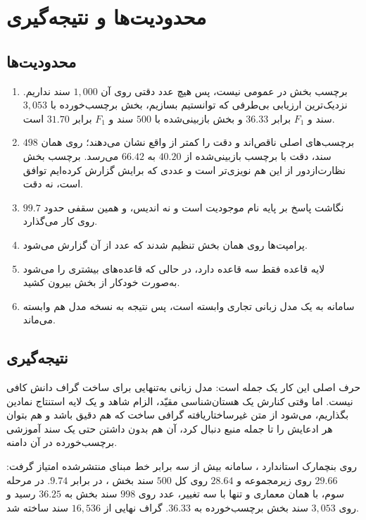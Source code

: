 \chapter{محدودیت‌ها و نتیجه‌گیری}
\label{ch:conclusion}

\section{محدودیت‌ها}
\label{sec:limitations}

\begin{enumerate}
\item برچسب بخش  در  عمومی نیست، پس هیچ عدد دقتی روی آن $1{,}000$ سند نداریم. نزدیک‌ترین ارزیابی بی‌طرفی که توانستیم بسازیم، بخش  برچسب‌خورده با $3{,}053$ سند و $F_1$ برابر $36.33$ و بخش  بازبینی‌شده  با $500$ سند و $F_1$ برابر $31.70$ است.
\item برچسب‌های اصلی  ناقص‌اند و دقت را کمتر از واقع نشان می‌دهند؛ روی همان $498$ سند، دقت با برچسب بازبینی‌شده از $40.20$ به $66.42$ می‌رسد. برچسب بخش نظارت‌ازدور از این هم نویزی‌تر است و عددی که برایش گزارش کرده‌ایم توافق است، نه دقت.
\item نگاشت پاسخ بر پایه نام موجودیت است و نه اندیس، و همین سقفی حدود $99.7$ روی کار می‌گذارد.
\item پرامپت‌ها روی همان بخش  تنظیم شدند که عدد از آن گزارش می‌شود.
\item لایه قاعده فقط سه قاعده دارد، در حالی که قاعده‌های بیشتری را می‌شود به‌صورت خودکار از بخش  بیرون کشید.
\item سامانه به یک مدل زبانی تجاری وابسته است، پس نتیجه به نسخه مدل هم وابسته می‌ماند.
\end{enumerate}

\section{نتیجه‌گیری}
\label{sec:conclusion}

حرف اصلی این کار یک جمله است: مدل زبانی به‌تنهایی برای ساخت گراف دانش کافی نیست. اما وقتی کنارش یک هستان‌شناسی مقیّد، الزام شاهد و یک لایه استنتاج نمادین بگذاریم، می‌شود از متن غیرساختاریافته گرافی ساخت که هم دقیق باشد و هم بتوان هر ادعایش را تا جمله منبع دنبال کرد، آن هم بدون داشتن حتی یک سند آموزشی برچسب‌خورده در آن دامنه.

روی بنچمارک استاندارد ، سامانه بیش از سه برابر خط مبنای منتشرشده امتیاز گرفت: $29.66$ روی زیرمجموعه و $28.64$ روی کل $500$ سند بخش ، در برابر $9.74$. در مرحله سوم، با همان معماری و تنها با سه تغییر، عدد روی $998$ سند بخش  به $36.25$ رسید و روی $3{,}053$ سند بخش  برچسب‌خورده به $36.33$. گراف نهایی از $16{,}536$ سند ساخته شد.

